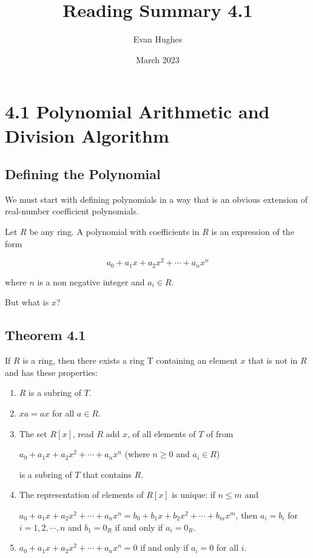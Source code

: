 \documentclass{article}
\title{Reading Summary 4.1}
\author{Evan Hughes}
\date{March 2023}
\begin{document}
\maketitle
\section*{4.1 Polynomial Arithmetic and Division Algorithm}
\subsection*{Defining the Polynomial}
We must start with defining polynomials in a way that is an obvious extension of real-number coefficient polynomials.

Let $R$ be any ring. A polynomial with coefficients in $R$ is an expression of the form 

\begin{equation}
    a_0 + a_1x + a_2x^2 + \cdots + a_nx^n
\end{equation}

where $n$ is a non negative integer and $a_i \in R$.

But what is $x$? 

\subsection*{Theorem 4.1}
If $R$ is a ring, then there exists a ring T containing an element $x$
that is not in $R$ and has these properties:
\begin{enumerate}
    \item $R$ is a subring of $T$.
    \item $xa = ax$ for all $a \in R$.
    \item The set $R[x]$, read $R$ add $x$, of all elements of $T$ of from
    \begin{center}
        $a_0 + a_1x + a_2x^2 + \cdots + a_nx^n$ (where $n \geq 0$ and $a_i \in R$)
    \end{center}
    is a subring of $T$ that contains $R$.
    \item The representation of elements of $R[x]$ is unique: if
    $n \leq m$ and 
    \begin{center}
        $a_0 + a_1x + a_2x^2 + \cdots + a_nx^n = b_0 + b_1x + b_2x^2 + \cdots + b_mx^m$,
        then $a_i = b_i$ for $i = 1, 2, \cdots, n$ and $b_1 = 0_R$ if and only if $a_i=0_R$.
    \end{center}
    \item $a_0 + a_1x + a_2x^2 + \cdots + a_nx^n = 0$ if and only if $a_i = 0$ for all $i$.
\end{enumerate}
\end{document}
